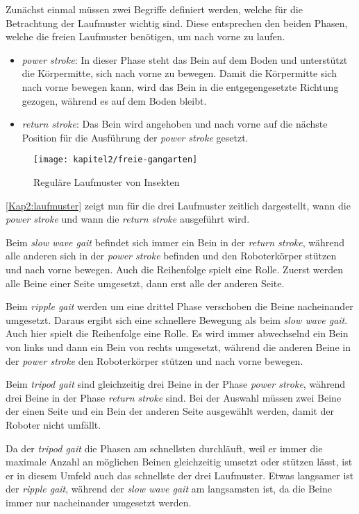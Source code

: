 Zunächst einmal müssen zwei Begriffe definiert werden, welche für die Betrachtung der Laufmuster wichtig sind. Diese entsprechen den beiden Phasen, welche die freien Laufmuster benötigen, um nach vorne zu laufen.
\begin{itemize}
\item \emph{power stroke}: In dieser Phase steht das Bein auf dem Boden und unterstützt die Körpermitte, sich nach vorne zu bewegen. Damit die Körpermitte sich nach vorne bewegen kann, wird das Bein in die entgegengesetzte Richtung gezogen, während es auf dem Boden bleibt.
\item \emph{return stroke}: Das Bein wird angehoben und nach vorne auf die nächste Position für die Ausführung der \emph{power stroke} gesetzt.
\end{itemize}

\begin{figure}[b!]
  \centering
  \texttt{[image: kapitel2/freie-gangarten]}
  \caption{Reguläre Laufmuster von Insekten \autocite{ferrell1995comparison} \autocite{wilson1966insect}}
  \label{Kap2:laufmuster}
\end{figure}

\autoref{Kap2:laufmuster} zeigt nun für die drei Laufmuster zeitlich dargestellt, wann die \emph{power stroke} und wann die \emph{return stroke} ausgeführt wird.

Beim \emph{slow wave gait} befindet sich immer ein Bein in der \emph{return stroke}, während alle anderen sich in der \emph{power stroke} befinden und den Roboterkörper stützen und nach vorne bewegen. Auch die Reihenfolge spielt eine Rolle. Zuerst werden alle Beine einer Seite umgesetzt, dann erst alle der anderen Seite.

Beim \emph{ripple gait} werden um eine drittel Phase verschoben die Beine nacheinander umgesetzt. Daraus ergibt sich eine schnellere Bewegung als beim \emph{slow wave gait}. Auch hier spielt die Reihenfolge eine Rolle. Es wird immer abwechselnd ein Bein von links und dann ein Bein von rechts umgesetzt, während die anderen Beine in der \emph{power stroke} den Roboterkörper stützen und nach vorne bewegen.

Beim \emph{tripod gait} sind gleichzeitig drei Beine in der Phase \emph{power stroke}, während drei Beine in der Phase \emph{return stroke} sind. Bei der Auswahl müssen zwei Beine der einen Seite und ein Bein der anderen Seite ausgewählt werden, damit der Roboter nicht umfällt.

Da der \emph{tripod gait} die Phasen am schnellsten durchläuft, weil er immer die maximale Anzahl an möglichen Beinen gleichzeitig umsetzt oder stützen lässt, ist er in diesem Umfeld auch das schnellste der drei Laufmuster. Etwas langsamer ist der \emph{ripple gait}, während der \emph{slow wave gait} am langsamsten ist, da die Beine immer nur nacheinander umgesetzt werden.

